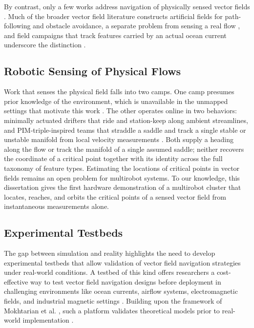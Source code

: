 By contrast, only a few works address navigation of physically sensed vector fields \cite{29,30,27}. Much of the broader vector field literature constructs artificial fields for path-following and obstacle avoidance, a separate problem from sensing a real flow \cite{31,32,25,33}, and field campaigns that track features carried by an actual ocean current underscore the distinction \cite{34}.

\subsection{Robotic Sensing of Physical Flows}

Work that senses the physical field falls into two camps. One camp presumes prior knowledge of the environment, which is unavailable in the unmapped settings that motivate this work \cite{35,36}. The other operates online in two behaviors: minimally actuated drifters that ride and station-keep along ambient streamlines, and PIM-triple-inspired teams that straddle a saddle and track a single stable or unstable manifold from local velocity measurements \cite{27,6,37}. Both supply a heading along the flow or track the manifold of a single assumed saddle; neither recovers the coordinate of a critical point together with its identity across the full taxonomy of feature types. Estimating the locations of critical points in vector fields remains an open problem for multirobot systems. To our knowledge, this dissertation gives the first hardware demonstration of a multirobot cluster that locates, reaches, and orbits the critical points of a sensed vector field from instantaneous measurements alone.

\subsection{Experimental Testbeds}

The gap between simulation and reality highlights the need to develop
experimental testbeds that allow validation of vector field navigation
strategies under real-world conditions. A testbed of this kind offers
researchers a cost-effective way to test vector field navigation designs
before deployment in challenging environments like ocean currents,
airflow systems, electromagnetic fields, and industrial magnetic settings
\cite{38,24}. Building upon the framework of Mokhtarian et al.
\cite{39}, such a platform validates theoretical models prior to
real-world implementation \cite{40,41}.

